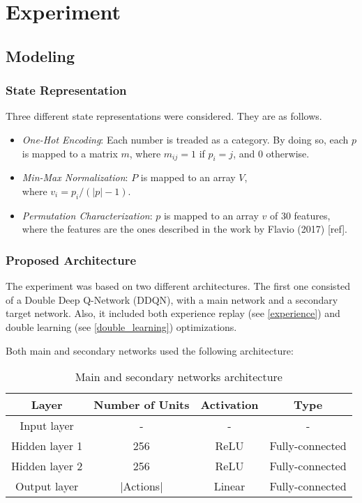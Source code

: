 \documentclass[11pt,twoside]{article}
\begin{document}
\section{Experiment}

\subsection{Modeling}

\subsubsection{State Representation}

Three different state representations were considered. They are as follows.

\begin{itemize}
	\item \textit{One-Hot Encoding}: Each number is treaded as a category. By doing so, each $p$ is mapped to a matrix $m$, where $m_{ij} = 1$ if $p_i = j$, and $0$ otherwise. 
	\item \textit{Min-Max Normalization}: $P$ is mapped to an array $V$,\\ where $v_i = p_i / (|p| - 1)$.
	\item \textit{Permutation Characterization}: $p$ is mapped to an array $v$ of $30$ features, where the features are the ones described in the work by Flavio (2017) [ref].
\end{itemize}

\subsubsection{Proposed Architecture}

The experiment was based on two different architectures. The first one consisted of a Double Deep Q-Network (DDQN), with a main network and a secondary target network. Also, it included both experience replay (see \ref{experience}) and double learning (see \ref{double_learning}) optimizations.

Both main and secondary networks used the following architecture:

\begin{table}[H]
	\begin{center}
		\begin{tabular}{|c|c|c|c|} 
			\hline
			Layer & Number of Units & Activation & Type \\
			\hline\hline
			Input layer & - & - & - \\ 
			\hline
			Hidden layer 1 & 256 & ReLU & Fully-connected\\
			\hline
			Hidden layer 2 & 256 & ReLU & Fully-connected\\
			\hline
			Output layer & $|$Actions$|$ & Linear & Fully-connected\\
			\hline
		\end{tabular}
		\caption{Main and secondary networks architecture}
	\end{center}
\end{table}
\end{document}
